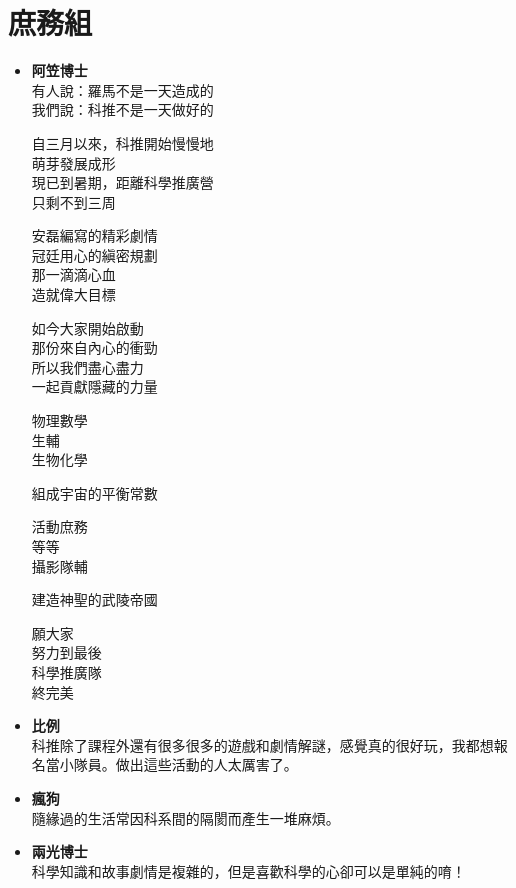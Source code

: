 \section{庶務組}
\begin{itemize}
\item \textbf{阿笠博士} \\
有人說：羅馬不是一天造成的\\
我們說：科推不是一天做好的

自三月以來，科推開始慢慢地 \\
萌芽\hspace{1em}發展\hspace{1em}成形 \\
現已到暑期，距離科學推廣營 \\
只剩\hspace{1em}不到\hspace{1em}三周 

安磊編寫的精彩劇情 \\
冠廷用心的縝密規劃 \\
那一滴滴心血 \\
造就偉大目標 

如今\hspace{1em}大家開始啟動 \\
那份來自內心的衝勁 \\
所以\hspace{1em}我們盡心盡力 \\
一起貢獻隱藏的力量

物理\hspace{2em}數學 \\
\phantom{活動}生輔 \\
生物\hspace{2em}化學

組成宇宙的\hspace{1em}平衡常數

活動\hspace{2em}庶務 \\
\phantom{活動}等等 \\
攝影\hspace{2em}隊輔

建造神聖的\hspace{1em}武陵帝國


願\hspace{1em}大家 \\
努力到最後 \\
科學推廣隊 \\
終\hspace{1em}完美

\item \textbf{比例} \\
科推除了課程外還有很多很多的遊戲和劇情解謎，感覺真的很好玩，我都想報名當小隊員。做出這些活動的人太厲害了。

\item \textbf{瘋狗} \\
隨緣過的生活常因科系間的隔閡而產生一堆麻煩。

\item \textbf{兩光博士} \\
科學知識和故事劇情是複雜的，但是喜歡科學的心卻可以是單純的唷！
\end{itemize}

